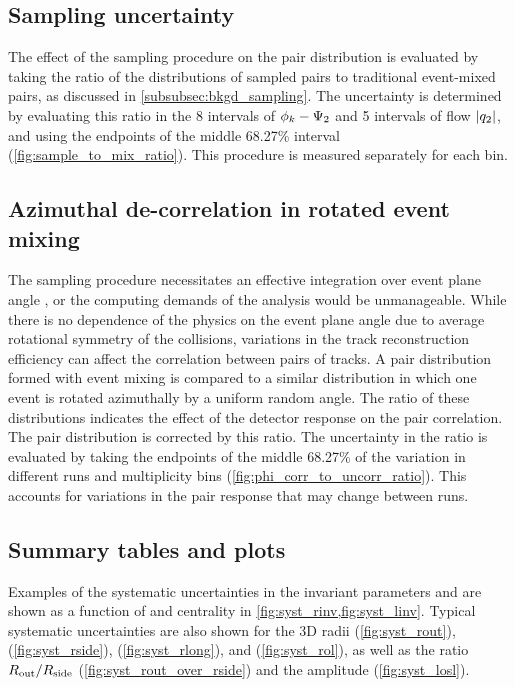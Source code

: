 \subsection{Sampling uncertainty}
The effect of the sampling procedure on the pair distribution is evaluated by taking the ratio of the distributions of sampled pairs to traditional event-mixed pairs, as discussed in \cref{subsubsec:bkgd_sampling}.
The uncertainty is determined by evaluating this ratio in the 8 intervals of $\phi_{k} - \Psi_{2}$ and 5 intervals of flow $|q_{2}|$, and using the endpoints of the middle 68.27\% interval (\cref{fig:sample_to_mix_ratio}).
This procedure is measured separately for each \kt bin.

\subsection{Azimuthal de-correlation in rotated event mixing}
The sampling procedure necessitates an effective integration over event plane angle \psit, or the computing demands of the analysis would be unmanageable. While there is no dependence of the physics on the event plane angle due to average rotational symmetry of the collisions, variations in the track reconstruction efficiency can affect the correlation between pairs of tracks. A pair distribution formed with event mixing is compared to a similar distribution in which one event is rotated azimuthally by a uniform random angle. The ratio of these distributions indicates the effect of the detector response on the pair correlation. The pair distribution is corrected by this ratio. The uncertainty in the ratio is evaluated by taking the endpoints of the middle 68.27\% of the variation in different runs and multiplicity bins (\cref{fig:phi_corr_to_uncorr_ratio}). This accounts for variations in the pair response that may change between runs.

\FloatBarrier
\subsection{Summary tables and plots}
Examples of the systematic uncertainties in the invariant parameters \Rinv and \linv are shown as a function of \kt and centrality in \cref{fig:syst_rinv,fig:syst_linv}.
Typical systematic uncertainties are also shown for the 3D radii \Rout (\cref{fig:syst_rout}), \Rside (\cref{fig:syst_rside}), \Rlong (\cref{fig:syst_rlong}), and \Rol (\cref{fig:syst_rol}), as well as the ratio $R_{\mathrm{out}} / R_{\mathrm{side}}$ (\cref{fig:syst_rout_over_rside}) and the amplitude (\cref{fig:syst_losl}).

